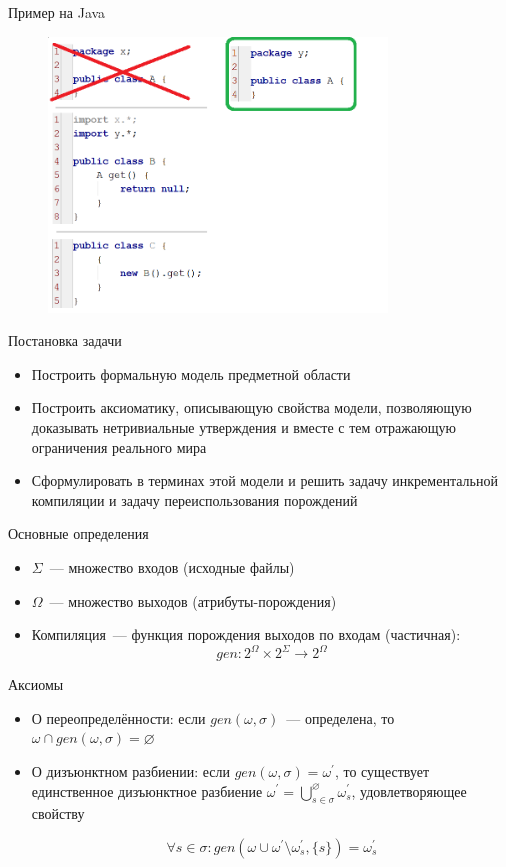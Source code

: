\begin{frame}{Пример на Java}
\begin{figure}[!h]
	\centering
	\includegraphics[width=90mm]{state2.png}
\end{figure}
\end{frame}

\begin{frame}{Постановка задачи}
\begin{itemize}
	\item Построить формальную модель предметной области
	\item Построить аксиоматику, описывающую свойства модели, позволяющую доказывать нетривиальные утверждения и вместе с тем отражающую ограничения реального мира
	\item Сформулировать в терминах этой модели и решить задачу инкрементальной компиляции и задачу переиспользования порождений
\end{itemize}
\end{frame}

\begin{frame}{Основные определения}

\begin{itemize}
	\item $\Sigma$~--- множество входов (исходные файлы)
	\item $\Omega$~--- множество выходов (атрибуты-порождения)
	\item Компиляция~--- функция порождения выходов по входам (частичная): $$gen : 2^\Omega \times 2^\Sigma \to 2^\Omega$$
\end{itemize}
\end{frame}

\begin{frame}{Аксиомы}
\begin{itemize}
	\item О переопределённости: если $gen(\omega,\sigma)$~--- определена, то $\omega\cap gen(\omega,\sigma) = \varnothing$
	
	\item О дизъюнктном разбиении: если $gen(\omega,\sigma) = \omega^\prime$, то существует единственное дизъюнктное разбиение $\omega^\prime=\bigcup^\varnothing_{s\in\sigma}\omega^\prime_s$, 
	удовлетворяющее свойству 

	$$\forall s\in\sigma : gen(\omega\cup\omega^\prime\setminus\omega^\prime_s,\{s\})=\omega^\prime_s$$
\end{itemize}
\end{frame}

